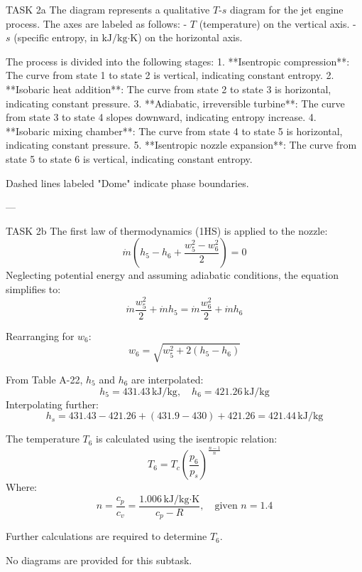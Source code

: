 TASK 2a  
The diagram represents a qualitative \( T \)-\( s \) diagram for the jet engine process. The axes are labeled as follows:  
- \( T \) (temperature) on the vertical axis.  
- \( s \) (specific entropy, in \( \text{kJ}/\text{kg·K} \)) on the horizontal axis.  

The process is divided into the following stages:  
1. **Isentropic compression**: The curve from state 1 to state 2 is vertical, indicating constant entropy.  
2. **Isobaric heat addition**: The curve from state 2 to state 3 is horizontal, indicating constant pressure.  
3. **Adiabatic, irreversible turbine**: The curve from state 3 to state 4 slopes downward, indicating entropy increase.  
4. **Isobaric mixing chamber**: The curve from state 4 to state 5 is horizontal, indicating constant pressure.  
5. **Isentropic nozzle expansion**: The curve from state 5 to state 6 is vertical, indicating constant entropy.  

Dashed lines labeled "Dome" indicate phase boundaries.  

---

TASK 2b  
The first law of thermodynamics (1HS) is applied to the nozzle:  
\[
\dot{m} \left( h_5 - h_6 + \frac{w_5^2 - w_6^2}{2} \right) = 0
\]  
Neglecting potential energy and assuming adiabatic conditions, the equation simplifies to:  
\[
\dot{m} \frac{w_5^2}{2} + \dot{m} h_5 = \dot{m} \frac{w_6^2}{2} + \dot{m} h_6
\]  

Rearranging for \( w_6 \):  
\[
w_6 = \sqrt{w_5^2 + 2(h_5 - h_6)}
\]  

From Table A-22, \( h_5 \) and \( h_6 \) are interpolated:  
\[
h_5 = 431.43 \, \text{kJ/kg}, \quad h_6 = 421.26 \, \text{kJ/kg}
\]  
Interpolating further:  
\[
h_s = 431.43 - 421.26 + (431.9 - 430) + 421.26 = 421.44 \, \text{kJ/kg}
\]  

The temperature \( T_6 \) is calculated using the isentropic relation:  
\[
T_6 = T_c \left( \frac{p_6}{p_s} \right)^{\frac{n-1}{n}}
\]  
Where:  
\[
n = \frac{c_p}{c_v} = \frac{1.006 \, \text{kJ/kg·K}}{c_p - R}, \quad \text{given } n = 1.4
\]  

Further calculations are required to determine \( T_6 \).  

No diagrams are provided for this subtask.